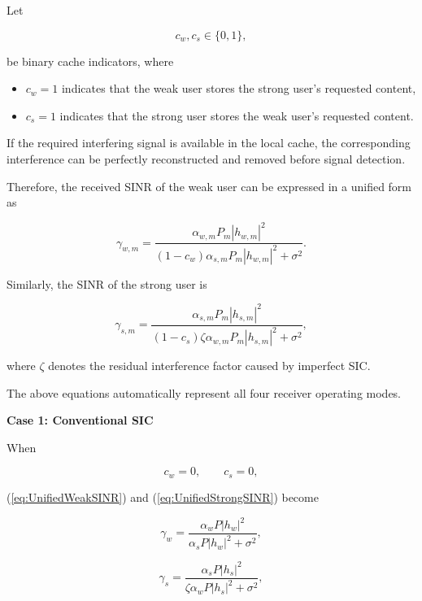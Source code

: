 \documentclass[12pt,a4paper]{article}
\begin{document}
Let

\begin{equation}
c_w,c_s\in\{0,1\},
\end{equation}

be binary cache indicators, where

\begin{itemize}
\item $c_w=1$ indicates that the weak user stores the strong user's requested content,
\item $c_s=1$ indicates that the strong user stores the weak user's requested content.
\end{itemize}

If the required interfering signal is available in the local cache, the corresponding interference can be perfectly reconstructed and removed before signal detection.

Therefore, the received SINR of the weak user can be expressed in a unified form as

\begin{equation}
\gamma_{w,m}
=
\frac{\alpha_{w,m}P_m|h_{w,m}|^2}
{(1-c_w)\alpha_{s,m}P_m|h_{w,m}|^2+\sigma^2}.
\label{eq:UnifiedWeakSINR}
\end{equation}

Similarly, the SINR of the strong user is

\begin{equation}
\gamma_{s,m}
=
\frac{\alpha_{s,m}P_m|h_{s,m}|^2}
{(1-c_s)\zeta\alpha_{w,m}P_m|h_{s,m}|^2+\sigma^2},
\label{eq:UnifiedStrongSINR}
\end{equation}

where $\zeta$ denotes the residual interference factor caused by imperfect SIC.

The above equations automatically represent all four receiver operating modes.

\textbf{Case 1: Conventional SIC}

When

\[
c_w=0,\qquad c_s=0,
\]

(\ref{eq:UnifiedWeakSINR}) and (\ref{eq:UnifiedStrongSINR}) become

\begin{equation}
\gamma_w=
\frac{\alpha_wP|h_w|^2}
{\alpha_sP|h_w|^2+\sigma^2},
\end{equation}

\begin{equation}
\gamma_s=
\frac{\alpha_sP|h_s|^2}
{\zeta\alpha_wP|h_s|^2+\sigma^2},
\end{equation}
\end{document}

